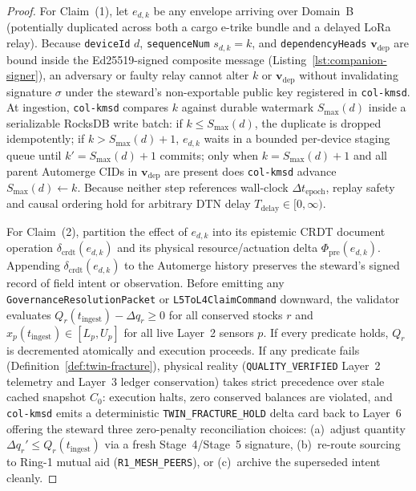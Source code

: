 \begin{proof}
For Claim~(1), let $e_{d,k}$ be any envelope arriving over Domain~B (potentially duplicated across both a cargo e-trike bundle and a delayed LoRa relay). Because \texttt{deviceId} $d$, \texttt{sequenceNum} $s_{d,k} = k$, and \texttt{dependencyHeads} $\mathbf{v}_{\mathrm{dep}}$ are bound inside the Ed25519-signed composite message (Listing~\ref{lst:companion-signer}), an adversary or faulty relay cannot alter $k$ or $\mathbf{v}_{\mathrm{dep}}$ without invalidating signature $\sigma$ under the steward's non-exportable public key registered in \texttt{col-kmsd}. At ingestion, \texttt{col-kmsd} compares $k$ against durable watermark $S_{\max}(d)$ inside a serializable RocksDB write batch: if $k \le S_{\max}(d)$, the duplicate is dropped idempotently; if $k > S_{\max}(d) + 1$, $e_{d,k}$ waits in a bounded per-device staging queue until $k' = S_{\max}(d)+1$ commits; only when $k = S_{\max}(d) + 1$ and all parent Automerge CIDs in $\mathbf{v}_{\mathrm{dep}}$ are present does \texttt{col-kmsd} advance $S_{\max}(d) \leftarrow k$. Because neither step references wall-clock $\Delta t_{\mathrm{epoch}}$, replay safety and causal ordering hold for arbitrary DTN delay $T_{\mathrm{delay}} \in [0, \infty)$.

For Claim~(2), partition the effect of $e_{d,k}$ into its epistemic CRDT document operation $\delta_{\mathrm{crdt}}(e_{d,k})$ and its physical resource/actuation delta $\Phi_{\mathrm{pre}}(e_{d,k})$. Appending $\delta_{\mathrm{crdt}}(e_{d,k})$ to the Automerge history preserves the steward's signed record of field intent or observation. Before emitting any \texttt{GovernanceResolutionPacket} or \texttt{L5ToL4ClaimCommand} downward, the validator evaluates $Q_r(t_{\mathrm{ingest}}) - \Delta q_r \ge 0$ for all conserved stocks $r$ and $x_p(t_{\mathrm{ingest}}) \in [L_p, U_p]$ for all live Layer~2 sensors $p$. If every predicate holds, $Q_r$ is decremented atomically and execution proceeds. If any predicate fails (Definition~\ref{def:twin-fracture}), physical reality (\texttt{QUALITY\_VERIFIED} Layer~2 telemetry and Layer~3 ledger conservation) takes strict precedence over stale cached snapshot $C_0$: execution halts, zero conserved balances are violated, and \texttt{col-kmsd} emits a deterministic \texttt{TWIN\_FRACTURE\_HOLD} delta card back to Layer~6 offering the steward three zero-penalty reconciliation choices: (a)~adjust quantity $\Delta q_r' \le Q_r(t_{\mathrm{ingest}})$ via a fresh Stage~4/Stage~5 signature, (b)~re-route sourcing to Ring-1 mutual aid (\texttt{R1\_MESH\_PEERS}), or (c)~archive the superseded intent cleanly.
\end{proof}

